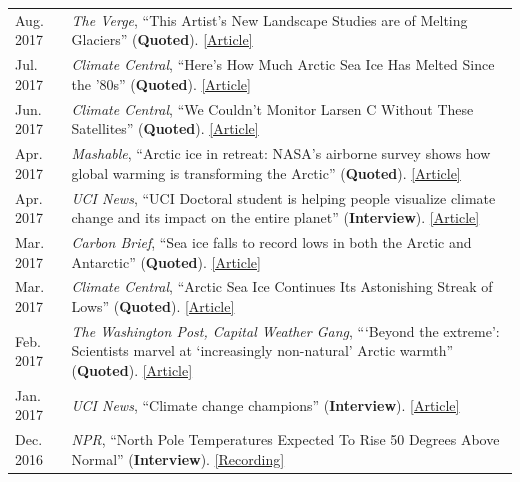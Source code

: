\documentclass[margin,line,palatino,courier,10pt]{res}
\begin{document}
\begin{resume}
\begin{tabular}{@{}p{0.9in}p{4in}}
Aug. 2017 & \textit{The Verge}, ``This Artist's New Landscape Studies are of Melting Glaciers'' (\textbf{Quoted}). \href{http://sites.uci.edu/zlabe/media-and-outreach/?preview_id=567&preview_nonce=d7dd77fe7a&_thumbnail_id=-1&preview=true}{[Article]}\\
Jul. 2017 & \textit{Climate Central}, ``Here's How Much Arctic Sea Ice Has Melted Since the '80s'' (\textbf{Quoted}). \href{http://www.climatecentral.org/news/arctic-sea-ice-melt-since-the-80s-21637}{[Article]}\\
Jun. 2017 & \textit{Climate Central}, ``We Couldn't Monitor Larsen C Without These Satellites'' (\textbf{Quoted}). \href{http://www.climatecentral.org/news/larsen-c-monitoring-satellites-21564}{[Article]}\\
Apr. 2017 & \textit{Mashable}, ``Arctic ice in retreat: NASA's airborne survey shows how global warming is transforming the Arctic'' (\textbf{Quoted}). \href{http://mashable.com/2017/04/13/arctic-meltdown-nasa-photos-changing-ice/?utm_cid=hp-n-1#BgdepWyM6Pq3}{[Article]}\\
Apr. 2017 & \textit{UCI News}, ``UCI Doctoral student is helping people visualize climate change and its impact on the entire planet'' (\textbf{Interview}). \href{http://grad.uci.edu/news-and-events/student-spotlights/Zachary-Labe.html}{[Article]}\\
Mar. 2017 & \textit{Carbon Brief}, ``Sea ice falls to record lows in both the Arctic and Antarctic'' (\textbf{Quoted}). \href{https://www.carbonbrief.org/sea-ice-falls-record-lows-arctic-antarctic}{[Article]}\\
Mar. 2017 & \textit{Climate Central}, ``Arctic Sea Ice Continues Its Astonishing Streak of Lows'' (\textbf{Quoted}). \href{http://www.climatecentral.org/news/arctic-sea-ice-record-low-streak-21227}{[Article]}\\
Feb. 2017 & \textit{The Washington Post, Capital Weather Gang}, ```Beyond the extreme': Scientists marvel at `increasingly non-natural' Arctic warmth'' (\textbf{Quoted}). \href{https://www.washingtonpost.com/news/capital-weather-gang/wp/2017/02/01/beyond-the-extreme-scientists-marvel-at-increasingly-non-natural-arctic-warmth/?sdfsdfsdfsdfsd&utm_term=.cf3cf81d24f3}{[Article]}\\
Jan. 2017 & \textit{UCI News}, ``Climate change champions'' (\textbf{Interview}). \href{https://news.uci.edu/climate-change-champions/}{[Article]}\\
Dec. 2016 & \textit{NPR}, ``North Pole Temperatures Expected To Rise 50 Degrees Above Normal'' (\textbf{Interview}). \href{http://www.npr.org/2016/12/21/506483966/north-pole-temperatures-expected-to-rise-50-degrees-above-normal}{[Recording]}\\

\end{tabular}
\end{resume}
\end{document}
